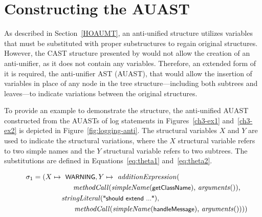 
\section{Constructing the AUAST}  \label{auast}
%
As described in Section~\ref{HOAUMT}, an anti-unified structure utilizes variables that must be substituted with proper substructures to regain original structures. However, the CAST structure presented by \citet{2008:fse:cottrell} would not allow the creation of an anti-unifier, as it does not contain any variables. Therefore, an extended form of it is required, the anti-unifier AST (AUAST), that would allow the insertion of variables in place of any node in the tree structure---including both subtrees and leaves---to indicate variations between the original structures.

To provide an example to demonstrate the structure, the anti-unified AUAST constructed from the AUASTs of log statements in Figures~\ref{ch3-ex1} and~\ref{ch3-ex2} is depicted in Figure~\ref{fig:logging-anti}. The structural variables $X$ and $Y$ are used to indicate the structural variations, where the $X$ structural variable refers to two simple names and the $Y$ structural variable refers to two subtrees. The substitutions are defined in Equations~\ref{eq:theta1} and~\ref{eq:theta2}.


\begin{align}
\sigma_1 = (X \mapsto \text{ \textsf{\small WARNING}}, Y \mapsto \text{ \textit{additionExpression}(}\hspace*{3cm}\nonumber\\
\text{\textit{methodCall}(\textit{simpleName}(\textsf{\small getClassName}), \textit{arguments}()),}\nonumber\\
\text{\textit{stringLiteral}(\textsf{\small "should extend ..."}),}\hspace*{4cm}\nonumber\\
\text{\textit{methodCall}(\textit{simpleName}(\textsf{\small handleMessage}), \textit{arguments}()))})\hspace*{-1em}\label{eq:theta1}
\end{align}

